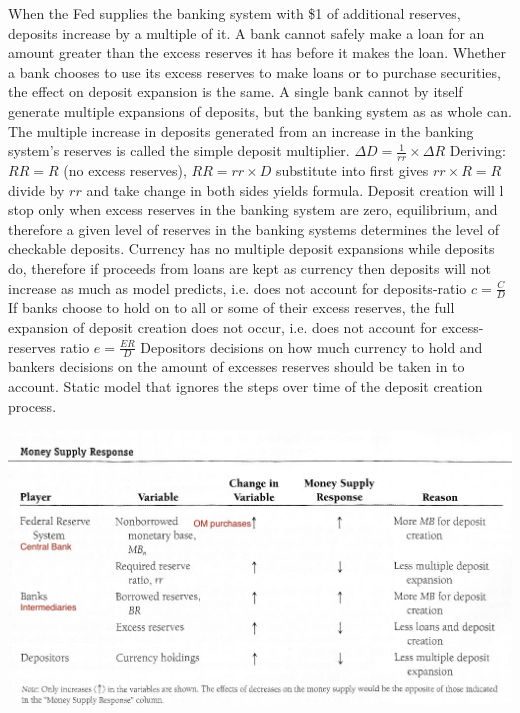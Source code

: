 \documentclass[12pt]{examnotes}
\begin{document}
\ra  When the Fed supplies the banking system with \$1 of additional reserves, deposits increase by a multiple of it.
\ra A bank cannot safely make a loan for an amount greater than the excess reserves it has before it makes the loan.
\ra Whether a bank chooses to use its excess reserves to make loans or to purchase securities, the effect on deposit expansion is the same.
\ra A single bank cannot by itself generate multiple expansions of deposits, but the banking system as as whole can.
\ra The multiple increase in deposits generated from an increase in the banking system's reserves is called the simple deposit multiplier. $\Delta D = \frac{1}{rr} \times \Delta R$
\rna Deriving: $RR=R$ (no excess reserves), $RR= rr \times D$ substitute into first gives $rr \times R =R$ divide by $rr$ and take change in both sides yields formula.
\ra Deposit creation will l stop only when excess reserves in the banking system are zero, equilibrium, and therefore a given level of reserves in the banking systems determines the level of checkable deposits.
\ra Currency has no multiple deposit expansions while deposits do, therefore if proceeds from loans are kept as currency then deposits will not increase as much as model predicts, i.e. does not account for deposits-ratio $c=\frac{C}{D}$
\ra If banks choose to hold on to all or some of their excess reserves, the full expansion of deposit creation does not occur, i.e. does not account for excess-reserves ratio $e=\frac{ER}{D}$
\ra Depositors decisions on how much currency to hold and bankers decisions on the amount of excesses reserves should be taken in to account.
\ra Static model that ignores the steps over time of the deposit creation process.

\includegraphics[scale=0.5]{./imgs/151.jpg}
\end{document}
